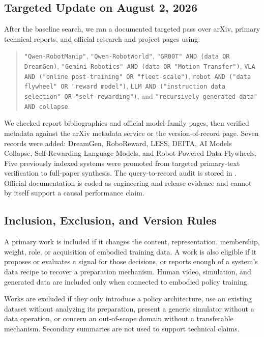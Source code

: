\subsection{Targeted Update on August 2, 2026}

After the baseline search, we ran a documented targeted pass over arXiv, primary technical reports, and official research and project pages using:
\begin{quote}\small
\texttt{"Qwen-RobotManip"}, \texttt{"Qwen-RobotWorld"}, \texttt{"GR00T" AND (data OR DreamGen)}, \texttt{"Gemini Robotics" AND (data OR "Motion Transfer")}, \texttt{VLA AND ("online post-training" OR "fleet-scale")}, \texttt{robot AND ("data flywheel" OR "reward model")}, \texttt{LLM AND ("instruction data selection" OR "self-rewarding")}, and \texttt{"recursively generated data" AND collapse}.
\end{quote}
We checked report bibliographies and official model-family pages, then verified metadata against the arXiv metadata service or the version-of-record page.
Seven records were added: DreamGen, RoboReward, LESS, DEITA, AI Models Collapse, Self-Rewarding Language Models, and Robot-Powered Data Flywheels.
Five previously indexed systems were promoted from targeted primary-text verification to full-paper synthesis.
The query-to-record audit is stored in .
Official documentation is coded as engineering and release evidence and cannot by itself support a causal performance claim.

\subsection{Inclusion, Exclusion, and Version Rules}

A primary work is included if it changes the content, representation, membership, weight, role, or acquisition of embodied training data.
A work is also eligible if it proposes or evaluates a signal for those decisions, or reports enough of a system's data recipe to recover a preparation mechanism.
Human video, simulation, and generated data are included only when connected to embodied policy training.

Works are excluded if they only introduce a policy architecture, use an existing dataset without analyzing its preparation, present a generic simulator without a data operation, or concern an out-of-scope domain without a transferable mechanism.
Secondary summaries are not used to support technical claims.

